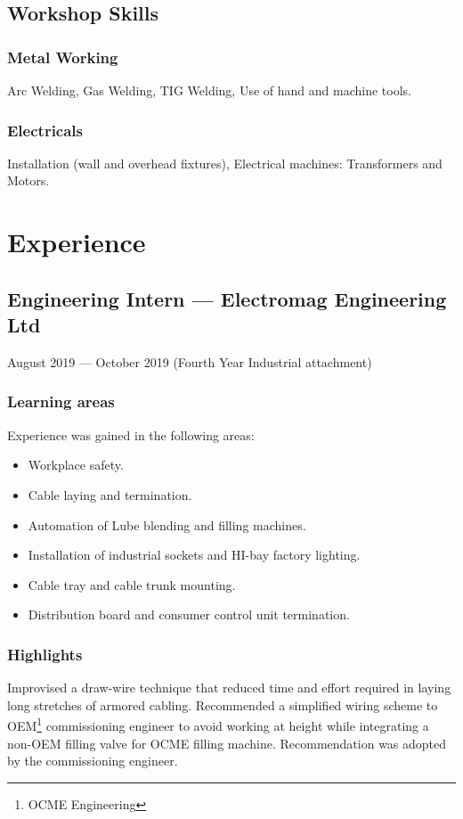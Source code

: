 \documentclass[a4paper]{article}
\begin{document}
\subsection{Workshop Skills}
\subsubsection{Metal Working}
Arc Welding, Gas Welding, TIG Welding, Use of hand and machine tools.
\subsubsection{Electricals}
Installation (wall and overhead fixtures), Electrical machines: Transformers and Motors.

\section{Experience}
\subsection{Engineering Intern --- Electromag Engineering Ltd}
August 2019 --- October 2019 (Fourth Year Industrial attachment)
\subsubsection{Learning areas}
Experience was gained in the following areas:
\begin{itemize}
	\item Workplace safety.
	\item Cable laying and termination.
	\item Automation of Lube blending and filling machines.
	\item Installation of industrial sockets and HI-bay factory lighting.
	\item Cable tray and cable trunk mounting.
	\item Distribution board and consumer control unit termination.
\end{itemize}
\subsubsection{Highlights}
Improvised a draw-wire technique that reduced time and effort required in laying long stretches of armored cabling.
Recommended a simplified wiring scheme to OEM\footnote{OCME Engineering} commissioning engineer to avoid working at height while integrating a non-OEM filling valve for OCME filling machine. Recommendation was adopted by the commissioning engineer.
\end{document}
